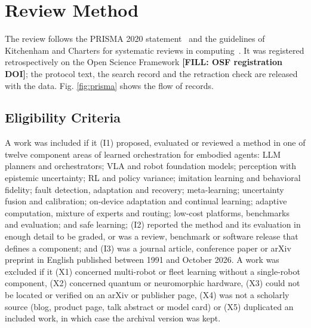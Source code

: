 \documentclass[journal]{IEEEtran}
\newcommand{\fillin}[1]{{\color{red}\bfseries [FILL: #1]}}
\begin{document}
\section{Review Method}\label{sec:method}
The review follows the PRISMA 2020 statement~\cite{Page2021} and the guidelines of Kitchenham and Charters for systematic reviews in computing~\cite{Kitchenham2007}. It was registered retrospectively on the Open Science Framework \fillin{OSF registration DOI}; the protocol text, the search record and the retraction check are released with the data. Fig. \ref{fig:prisma} shows the flow of records.

\subsection{Eligibility Criteria}\label{sec:criteria}
A work was included if it (I1) proposed, evaluated or reviewed a method in one of twelve component areas of learned orchestration for embodied agents: LLM planners and orchestrators; VLA and robot foundation models; perception with epistemic uncertainty; RL and policy variance; imitation learning and behavioral fidelity; fault detection, adaptation and recovery; meta-learning; uncertainty fusion and calibration; on-device adaptation and continual learning; adaptive computation, mixture of experts and routing; low-cost platforms, benchmarks and evaluation; and safe learning; (I2) reported the method and its evaluation in enough detail to be graded, or was a review, benchmark or software release that defines a component; and (I3) was a journal article, conference paper or arXiv preprint in English published between 1991 and October 2026. A work was excluded if it (X1) concerned multi-robot or fleet learning without a single-robot component, (X2) concerned quantum or neuromorphic hardware, (X3) could not be located or verified on an arXiv or publisher page, (X4) was not a scholarly source (blog, product page, talk abstract or model card) or (X5) duplicated an included work, in which case the archival version was kept.
\end{document}
